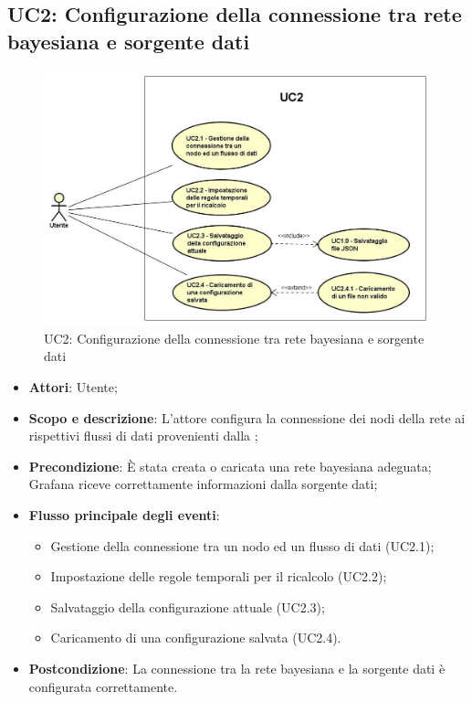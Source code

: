 \subsection{UC2: Configurazione della connessione tra rete bayesiana e sorgente dati}
\hypertarget{UC2}{}
\begin{figure} [H]
	\centering
	\includegraphics[scale=0.45]{Img/UC2}
	\caption{UC2: Configurazione della connessione tra rete bayesiana e sorgente dati}\label{}
\end{figure}
\begin{itemize}
	\item \textbf{Attori}: Utente;
	\item \textbf{Scopo e descrizione}: L'attore configura la connessione dei nodi della rete ai rispettivi flussi di dati provenienti dalla ;
	\item \textbf{Precondizione}: È stata creata o caricata una rete bayesiana adeguata; Grafana riceve correttamente informazioni dalla sorgente dati;
	\item \textbf{Flusso principale degli eventi}:
	\begin{itemize}
		\item Gestione della connessione tra un nodo ed un flusso di dati (UC2.1);
		\item Impostazione delle regole temporali per il ricalcolo (UC2.2);
		\item Salvataggio della configurazione attuale (UC2.3);
		\item Caricamento di una configurazione salvata (UC2.4).
	\end{itemize}
	\item \textbf{Postcondizione}: La connessione tra la rete bayesiana e la sorgente dati è configurata correttamente.
\end{itemize}

